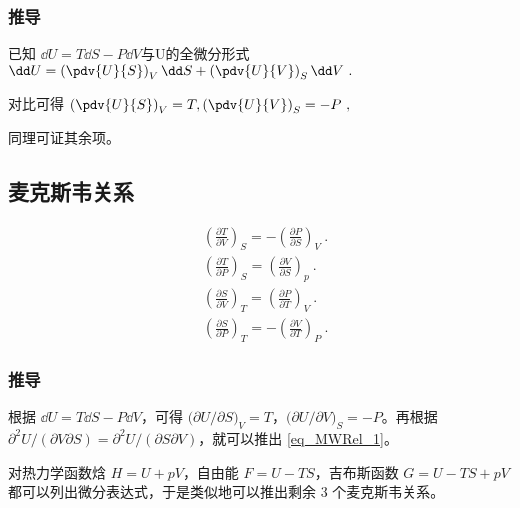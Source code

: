 \subsubsection{推导}
已知 $\dd U = T \dd S - P \dd V$与U的全微分形式 $\dd U = \left(\pdv{U}{S}\right)_V \dd S+\left(\pdv{U}{V}\right)_S \dd V~.$

对比可得 $\left(\pdv{U}{S}\right)_V=T, \left(\pdv{U}{V}\right)_S=-P~,$

同理可证其余项。

\subsection{麦克斯韦关系}

\begin{align}
&\left(\frac{\partial T}{\partial V}\right)_S=-\left(\frac{\partial P}{\partial S}\right)_V\label{eq_MWRel_1}~.
\\
&\left(\frac{\partial T}{\partial P}\right)_S=\left(\frac{\partial V}{\partial S}\right)_p~.
\\
&\left(\frac{\partial S}{\partial V}\right)_T=\left(\frac{\partial P}{\partial T}\right)_V~.
\\
&\left(\frac{\partial S}{\partial P}\right)_T=-\left(\frac{\partial V}{\partial T}\right)_P~.
\end{align}

\subsubsection{推导}
根据 $\dd U=T\dd S-P\dd V$，可得 $\Big(\partial U/\partial S\Big)_V=T$，$\Big(\partial U/\partial V\Big)_S=-P$。再根据 $\partial^2 U/(\partial V\partial S)=\partial^2 U/(\partial S\partial V)$，就可以推出 \autoref{eq_MWRel_1}。

对热力学函数焓 $H=U+pV$，自由能 $F=U-TS$，吉布斯函数 $G=U-TS+pV$ 都可以列出微分表达式，于是类似地可以推出剩余 $3$ 个麦克斯韦关系。

